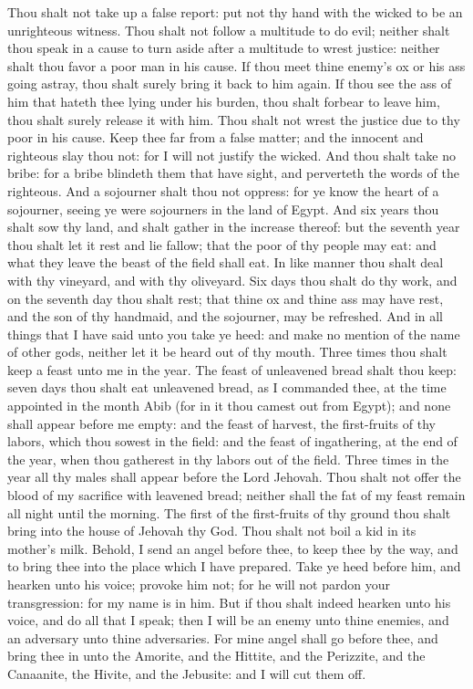 Thou shalt not take up a false report: put not thy hand with the wicked to be an unrighteous witness. Thou shalt not follow a multitude to do evil; neither shalt thou speak in a cause to turn aside after a multitude to wrest justice: neither shalt thou favor a poor man in his cause.  If thou meet thine enemy’s ox or his ass going astray, thou shalt surely bring it back to him again. If thou see the ass of him that hateth thee lying under his burden, thou shalt forbear to leave him, thou shalt surely release it with him.  Thou shalt not wrest the justice due to thy poor in his cause. Keep thee far from a false matter; and the innocent and righteous slay thou not: for I will not justify the wicked. And thou shalt take no bribe: for a bribe blindeth them that have sight, and perverteth the words of the righteous. And a sojourner shalt thou not oppress: for ye know the heart of a sojourner, seeing ye were sojourners in the land of Egypt.  And six years thou shalt sow thy land, and shalt gather in the increase thereof: but the seventh year thou shalt let it rest and lie fallow; that the poor of thy people may eat: and what they leave the beast of the field shall eat. In like manner thou shalt deal with thy vineyard, and with thy oliveyard. Six days thou shalt do thy work, and on the seventh day thou shalt rest; that thine ox and thine ass may have rest, and the son of thy handmaid, and the sojourner, may be refreshed. And in all things that I have said unto you take ye heed: and make no mention of the name of other gods, neither let it be heard out of thy mouth.  Three times thou shalt keep a feast unto me in the year. The feast of unleavened bread shalt thou keep: seven days thou shalt eat unleavened bread, as I commanded thee, at the time appointed in the month Abib (for in it thou camest out from Egypt); and none shall appear before me empty: and the feast of harvest, the first-fruits of thy labors, which thou sowest in the field: and the feast of ingathering, at the end of the year, when thou gatherest in thy labors out of the field. Three times in the year all thy males shall appear before the Lord Jehovah.  Thou shalt not offer the blood of my sacrifice with leavened bread; neither shall the fat of my feast remain all night until the morning. The first of the first-fruits of thy ground thou shalt bring into the house of Jehovah thy God. Thou shalt not boil a kid in its mother’s milk.  Behold, I send an angel before thee, to keep thee by the way, and to bring thee into the place which I have prepared. Take ye heed before him, and hearken unto his voice; provoke him not; for he will not pardon your transgression: for my name is in him. But if thou shalt indeed hearken unto his voice, and do all that I speak; then I will be an enemy unto thine enemies, and an adversary unto thine adversaries. For mine angel shall go before thee, and bring thee in unto the Amorite, and the Hittite, and the Perizzite, and the Canaanite, the Hivite, and the Jebusite: and I will cut them off. 